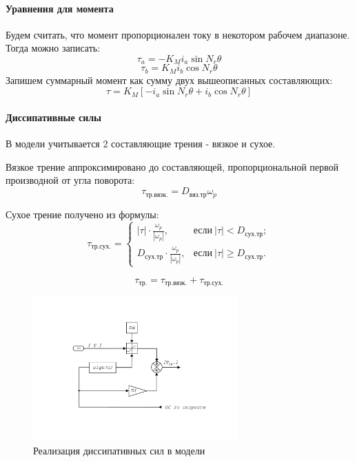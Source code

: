 \paragraph{ Уравнения для момента }
Будем считать, что момент пропорционален току в некотором рабочем диапазоне. Тогда можно записать:
$$
    \tau_{a} = - K_{M} i_{a} \sin{N_{r} \theta}
$$
$$
    \tau_{b} = K_{M} i_{b} \cos{N_{r} \theta}
$$
Запишем суммарный момент как сумму двух вышеописанных составляющих:
\begin{equation}
    \tau = K_{M} [-i_{a} \sin{N_{r}\theta} + i_{b} \cos{N_{r}\theta}]
\end{equation}


\paragraph{ Диссипативные силы }
В модели учитывается 2 составляющие трения - вязкое и сухое.

Вязкое трение аппроксимировано до составляющей, пропорциональной первой производной от угла поворота:
\begin{equation}
    \tau_{\text{тр.вязк.}} = D_{\text{вяз.тр}} \omega_{p}
\end{equation}

Сухое трение получено из формулы:
\begin{equation}
    \tau_{\text{тр.сух.}} = \begin{cases}
         |\tau| \cdot \frac{\omega_{p}}{|\omega_{p}|}, & \text{если} ~|\tau|  <  D_{\text{сух.тр}}; \\[2mm]
         D_{\text{сух.тр}}  \cdot \frac{\omega_{p}}{|\omega_{p}|}, & \text{если} ~|\tau| \ge D_{\text{сух.тр}}.
    \end{cases}
\end{equation}

\begin{equation}
    \tau_{\text{тр.}} = \tau_{\text{тр.вязк.}} + \tau_{\text{тр.сух.}}
\end{equation}

\begin{figure}[ht!]
    \centering
    \includegraphics[width=0.7\textwidth, keepaspectratio, clip=true, trim=25mm 35mm 25mm 35mm]
                    {./src/pictures/drive_model/drive_model_friction}
    \caption{Реализация диссипативных сил в модели}
    \label{pic_drive_model_friction}
\end{figure}

